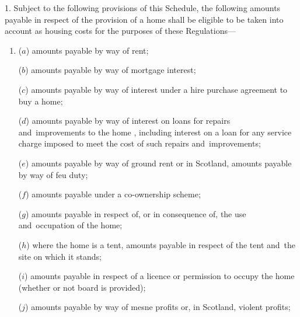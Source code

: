 \documentclass[12pt,a4paper]{article}
\begin{document}
1.  Subject to the following provisions of this Schedule, 
the following amounts payable  %
in respect of the provision of a home shall be eligible to be taken into account as housing costs for the purposes of these Regulations—
\begin{enumerate}\item[]
($a$) 
amounts payable by way of  %
rent;


($b$) amounts payable by way of mortgage interest;

($c$) 
amounts payable by way of interest  %
under a hire purchase agreement to buy a home;

($d$) 
amounts payable by way of interest  %
on loans for repairs and~improvements to the home%
, including interest on a loan for any service charge imposed to meet the cost of such repairs and~improvements; %

($e$) 
amounts payable  %
by way of ground rent or in Scotland, 
amounts payable  %
by way of feu duty;

($f$) 
amounts payable  %
under a co-ownership scheme;

($g$) 
amounts payable  %
in respect of, or in consequence of, the use and~occupation of the home;

($h$) where the home is a tent, 
amounts payable  %
in respect of the tent and~the site on which it stands;

($i$) 
amounts payable  %
in respect of a licence or permission to occupy the home (whether or not board is provided);

($j$) 
amounts payable  %
by way of mesne profits or, in Scotland, violent profits;


\end{enumerate}
\end{document}
